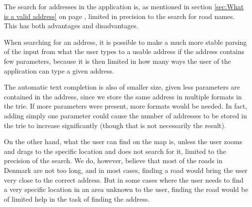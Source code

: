 The search for addresses in the application is, as mentioned in section \ref{sec:What is a valid address} on page \pageref{sec:What is a valid address}, limited in precision to the search for road names. This has both advantages and disadvantages.

When searching for an address, it is possible to make a much more stable parsing of the input from what the user types to a usable address if the address contains few parameters, because it is then limited in how many ways the user of the application can type a given address.

The automatic text completion is also of smaller size, given less parameters are contained in the address, since we store the same address in multiple formats in the trie. If more parameters were present, more formats would be needed. In fact, adding simply one parameter could cause the number of addresses to be stored in the trie to increase significantly (though that is not necessarily the result).

On the other hand, what the user can find on the map is, unless the user zooms and drags to the specific location and does not search for it, limited to the precision of the search. We do, however, believe that most of the roads in Denmark are not too long, and in most cases, finding a road would bring the user very close to the correct address. But in some cases where the user needs to find a very specific location in an area unknown to the user, finding the road would be of limited help in the task of finding the address.